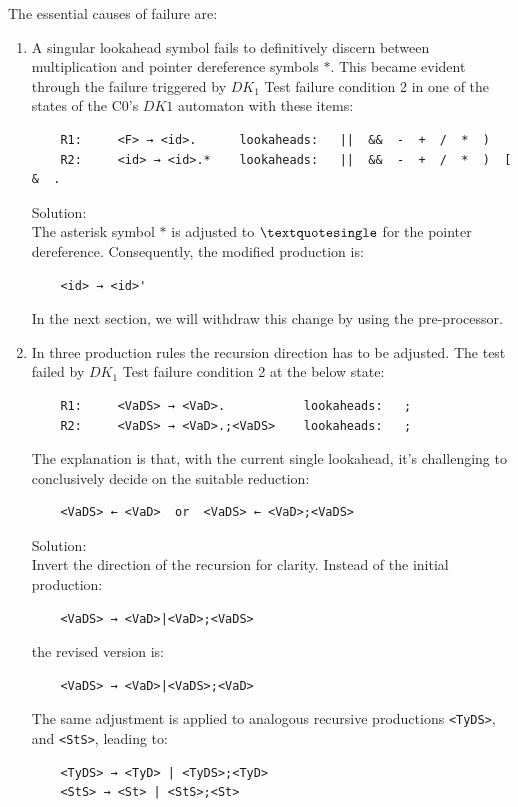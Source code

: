 The essential causes of failure are:

\begin{enumerate}
    \item A singular lookahead symbol fails to definitively discern between multiplication and pointer dereference symbols \(\ast\). This became evident through the failure triggered by \({DK_{1}}\) Test failure condition 2 in one of the states of the C0's \(DK1\) automaton with these items:
    \begin{verbatim}
    R1:     <F> → <id>.      lookaheads:   ||  &&  -  +  /  *  )
    R2:     <id> → <id>.*    lookaheads:   ||  &&  -  +  /  *  )  [  &  .
    \end{verbatim}
    Solution: \\
    The asterisk symbol \(\ast\) is adjusted to \(\textquotesingle\) for the pointer dereference. Consequently, the modified production is:
    \begin{verbatim}
    <id> → <id>'
    \end{verbatim}
    In the next section, we will withdraw this change by using the pre-processor.

    \item In three production rules the recursion direction has to be adjusted.
    The test failed by \({DK_{1}}\) Test failure condition 2 at the below state:
    \begin{verbatim}
    R1:     <VaDS> → <VaD>.           lookaheads:   ;
    R2:     <VaDS> → <VaD>.;<VaDS>    lookaheads:   ;
    \end{verbatim}
    The explanation is that, with the current single lookahead, it’s challenging to conclusively decide on the suitable reduction:
    \begin{verbatim}
    <VaDS> ← <VaD>  or  <VaDS> ← <VaD>;<VaDS>
    \end{verbatim}

    Solution: \\
    Invert the direction of the recursion for clarity. Instead of the initial production:
    \begin{verbatim}
    <VaDS> → <VaD>|<VaD>;<VaDS>
    \end{verbatim}
    the revised version is:
    \begin{verbatim}
    <VaDS> → <VaD>|<VaDS>;<VaD>
    \end{verbatim}

    The same adjustment is applied to analogous recursive productions \texttt{<TyDS>}, and \texttt{<StS>}, leading to:
    \begin{verbatim}
    <TyDS> → <TyD> | <TyDS>;<TyD>
    <StS> → <St> | <StS>;<St>
    \end{verbatim}


\end{enumerate}
